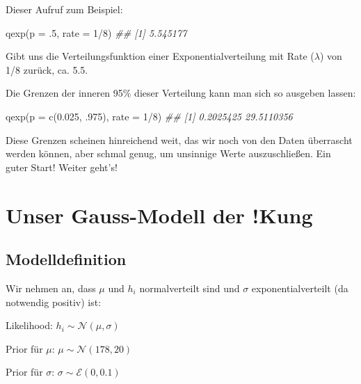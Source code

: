 \documentclass[
  a4paper,
  DIV=11]{scrreprt}
\newenvironment{Shaded}{\begin{snugshade}}{\end{snugshade}}
\newcommand{\AttributeTok}[1]{\textcolor[rgb]{0.40,0.45,0.13}{#1}}
\newcommand{\DecValTok}[1]{\textcolor[rgb]{0.68,0.00,0.00}{#1}}
\newcommand{\DocumentationTok}[1]{\textcolor[rgb]{0.37,0.37,0.37}{\textit{#1}}}
\newcommand{\FloatTok}[1]{\textcolor[rgb]{0.68,0.00,0.00}{#1}}
\newcommand{\FunctionTok}[1]{\textcolor[rgb]{0.28,0.35,0.67}{#1}}
\newcommand{\NormalTok}[1]{\textcolor[rgb]{0.00,0.23,0.31}{#1}}
\newcommand{\SpecialCharTok}[1]{\textcolor[rgb]{0.37,0.37,0.37}{#1}}
\theoremstyle{definition}
\theoremstyle{remark}
\begin{document}
Dieser Aufruf zum Beispiel:

\begin{Shaded}
\begin{Highlighting}[]
\FunctionTok{qexp}\NormalTok{(}\AttributeTok{p =}\NormalTok{ .}\DecValTok{5}\NormalTok{, }\AttributeTok{rate =} \DecValTok{1}\SpecialCharTok{/}\DecValTok{8}\NormalTok{)}
\DocumentationTok{\#\# [1] 5.545177}
\end{Highlighting}
\end{Shaded}

Gibt uns die Verteilungsfunktion einer Exponentialverteilung mit Rate
(\(\lambda\)) von 1/8 zurück, ca. 5.5.

Die Grenzen der inneren 95\% dieser Verteilung kann man sich so ausgeben
lassen:

\begin{Shaded}
\begin{Highlighting}[]
\FunctionTok{qexp}\NormalTok{(}\AttributeTok{p =} \FunctionTok{c}\NormalTok{(}\FloatTok{0.025}\NormalTok{, .}\DecValTok{975}\NormalTok{), }\AttributeTok{rate =} \DecValTok{1}\SpecialCharTok{/}\DecValTok{8}\NormalTok{)}
\DocumentationTok{\#\# [1]  0.2025425 29.5110356}
\end{Highlighting}
\end{Shaded}

Diese Grenzen scheinen hinreichend weit, das wir noch von den Daten
überrascht werden können, aber schmal genug, um unsinnige Werte
auszuschließen. Ein guter Start! Weiter geht's!

\hypertarget{unser-gauss-modell-der-kung}{%
\section{Unser Gauss-Modell der
!Kung}\label{unser-gauss-modell-der-kung}}

\hypertarget{modelldefinition}{%
\subsection{Modelldefinition}\label{modelldefinition}}

Wir nehmen an, dass \(\mu\) und \(h_i\) normalverteilt sind und
\(\sigma\) exponentialverteilt (da notwendig positiv) ist:

Likelihood: \(h_i \sim \mathcal{N}(\mu, \sigma)\)

Prior für \(\mu\): \(\mu \sim \mathcal{N}(178, 20)\)

Prior für \(\sigma\): \(\sigma \sim \mathcal{E}(0, 0.1)\)
\end{document}

